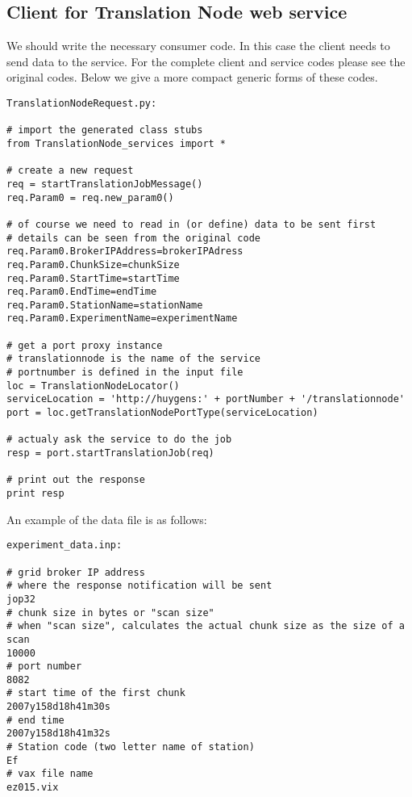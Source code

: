 \subsection{Client for Translation Node web service}\label{tn_client}

We should write the necessary consumer code. In this case the client needs to
send data to the service. For the complete client and service codes please see
the original codes. Below we give a more compact generic forms of these codes.

\begin{verbatim}
TranslationNodeRequest.py:

# import the generated class stubs
from TranslationNode_services import *

# create a new request
req = startTranslationJobMessage()
req.Param0 = req.new_param0()

# of course we need to read in (or define) data to be sent first
# details can be seen from the original code
req.Param0.BrokerIPAddress=brokerIPAdress
req.Param0.ChunkSize=chunkSize
req.Param0.StartTime=startTime
req.Param0.EndTime=endTime
req.Param0.StationName=stationName
req.Param0.ExperimentName=experimentName

# get a port proxy instance
# translationnode is the name of the service
# portnumber is defined in the input file
loc = TranslationNodeLocator()
serviceLocation = 'http://huygens:' + portNumber + '/translationnode'
port = loc.getTranslationNodePortType(serviceLocation)

# actualy ask the service to do the job
resp = port.startTranslationJob(req)

# print out the response
print resp
\end{verbatim}

An example of the data file is as follows:

\begin{verbatim}
experiment_data.inp:

# grid broker IP address
# where the response notification will be sent
jop32
# chunk size in bytes or "scan size"
# when "scan size", calculates the actual chunk size as the size of a scan 
10000
# port number
8082
# start time of the first chunk
2007y158d18h41m30s
# end time
2007y158d18h41m32s
# Station code (two letter name of station)
Ef
# vax file name
ez015.vix
\end{verbatim}

